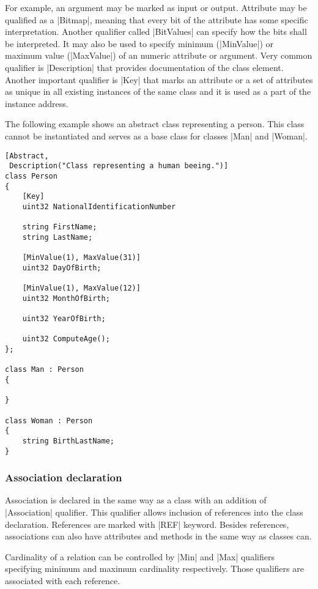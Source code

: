 For example, an argument may be marked as input or output. Attribute may be
qualified as a |Bitmap|, meaning that every bit of the attribute has some
specific interpretation. Another qualifier called |BitValues| can specify how
the bits shall be interpreted. It may also be used to specify minimum
(|MinValue|) or maximum value (|MaxValue|) of an numeric attribute or argument.
Very common qualifier is |Description| that provides documentation of the class
element. Another important qualifier is |Key| that marks an attribute or a set
of attributes as unique in all existing instances of the same class and it is
used as a part of the instance address.

The following example shows an abstract class representing a person. This class
cannot be instantiated and serves as a base class for classes |Man| and |Woman|.

\begin{lstlisting}[caption={MOF example: Person},
label=lst:wbem:mof:class]
[Abstract,
 Description("Class representing a human beeing.")]
class Person
{
    [Key]
    uint32 NationalIdentificationNumber
    
    string FirstName;
    string LastName;
    
    [MinValue(1), MaxValue(31)]
    uint32 DayOfBirth;
    
    [MinValue(1), MaxValue(12)]
    uint32 MonthOfBirth;
    
    uint32 YearOfBirth;
    
    uint32 ComputeAge();
};

class Man : Person
{

}

class Woman : Person
{
    string BirthLastName;
}
\end{lstlisting}

\subsubsection{Association declaration}
\label{wbem:cim:mof:instance}

Association is declared in the same way as a class with an addition of
|Association| qualifier. This qualifier allows inclusion of references into the
class declaration. References are marked with |REF| keyword. Besides references,
associations can also have attributes and methods in the same way as classes
can.

Cardinality of a relation can be controlled by |Min| and |Max| qualifiers
specifying minimum and maximum cardinality respectively. Those qualifiers are
associated with each reference.

